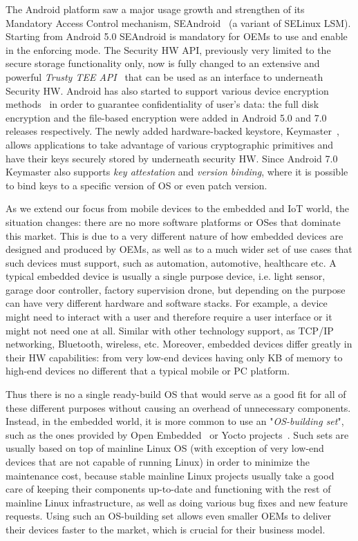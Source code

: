 The Android platform saw a major usage growth and strengthen of its Mandatory Access Control mechanism, SEAndroid~\cite{smalley12} (a variant of SELinux LSM). Starting from Android 5.0 SEAndroid is mandatory for OEMs to use and enable in the enforcing mode. The Security HW API, previously very limited to the secure storage functionality only, now is fully changed to an extensive and powerful \textit{Trusty TEE API}~\cite{trusty} that can be used as an interface to underneath Security HW. Android has also started to support various device encryption methods~\cite{androidencr} in order to guarantee confidentiality of user's data: the full disk encryption and the file-based encryption were added in Android 5.0 and 7.0 releases respectively. The newly added hardware-backed keystore, Keymaster~\cite{androidkeymaster}, allows applications to take advantage of various cryptographic primitives and have their keys securely stored by underneath security HW. Since Android 7.0 Keymaster also supports \textit{key attestation} and \textit{version binding}, where it is possible to bind keys to a specific version of OS or even patch version. 


As we extend our focus from mobile devices to the embedded and IoT world, the situation changes: there are no more software platforms or OSes that dominate this market. This is due to a very different nature of how embedded devices are designed and produced by OEMs, as well as to a much wider set of use cases that such devices must support, such as automation, automotive, healthcare etc. A typical embedded device is usually a single purpose device, i.e. light sensor, garage door controller, factory supervision drone, but depending on the purpose can have very different hardware and software stacks. For example, a device might need to interact with a user and therefore require a user interface or it might not need one at all. Similar with other technology support, as TCP/IP networking, Bluetooth, wireless, etc. Moreover, embedded devices differ greatly in their HW capabilities: from very low-end devices having only KB of memory to high-end devices no different that a typical mobile or PC platform.

Thus there is no a single ready-build OS that would serve as a good fit for all of these different purposes without causing an overhead of unnecessary components. Instead, in the embedded world, it is more common to use an "\textit{OS-building set}", such as the ones provided by Open Embedded~\cite{OE2017} or Yocto projects~\cite{yocto2017}. Such sets are usually based on top of mainline Linux OS (with exception of very low-end devices that are not capable of running Linux) in order to minimize the maintenance cost, because stable mainline Linux projects usually take a good care of keeping their components up-to-date and functioning with the rest of mainline Linux infrastructure, as well as doing various bug fixes and new feature requests. Using such an OS-building set allows even smaller OEMs to deliver their devices faster to the market, which is crucial for their business model.

